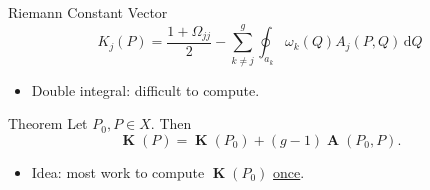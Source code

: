 \documentclass{beamer}
\newcommand{\dQ}{\,\mathrm{d}Q}
\DeclareMathOperator{\DivD}{\mathcal{D}}
\DeclareMathOperator{\RCV}{\boldsymbol{K}}
\DeclareMathOperator{\Abel}{\boldsymbol{A}}
\begin{document}













\begin{frame}{Riemann Constant Vector}
  \[
  K_j(P) = \frac{1 + \Omega_{jj}}{2} - \sum_{k \neq j}^g
           \oint_{a_k} \omega_k(Q) A_j(P,Q) \dQ
  \]

  \begin{itemize}
  \item Double integral: difficult to compute.
  \end{itemize}

  \pause

  \begin{block}{Theorem}
    Let $P_0,P \in X$. Then
    \[
    \RCV(P) = \RCV(P_0) + (g-1)\Abel(P_0,P).
    \]
  \end{block}

  \pause

  \begin{itemize}
  \item Idea: most work to compute $\RCV(P_0)$ \underline{once}.
  \end{itemize}
\end{frame}
\end{document}
